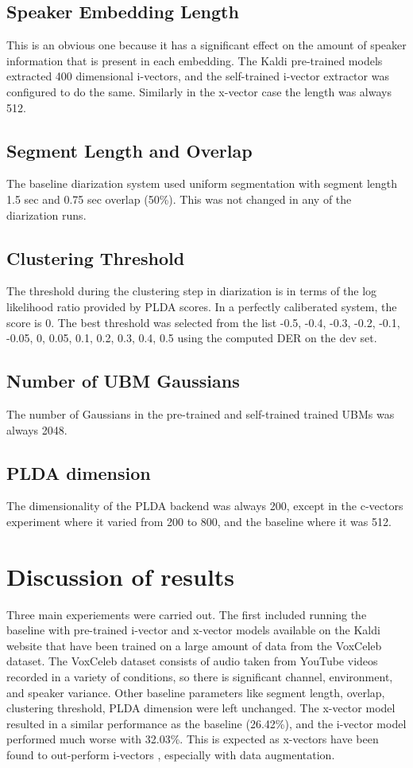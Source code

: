 		\subsection{Speaker Embedding Length}
			This is an obvious one because it has a significant effect on the amount of speaker information that is present in each embedding. The Kaldi pre-trained models extracted 400 dimensional i-vectors, and the self-trained i-vector extractor was configured to do the same. Similarly in the x-vector case the length was always 512.
		\subsection{Segment Length and Overlap}
		The baseline diarization system used uniform segmentation with segment length 1.5 sec and 0.75 sec overlap (50\%). This was not changed in any of the diarization runs.
		\subsection{Clustering Threshold}
		The threshold during the clustering step in diarization is in terms of the log likelihood ratio provided by PLDA scores. In a perfectly caliberated system, the score is 0. The best threshold was selected from the list -0.5, -0.4, -0.3, -0.2, -0.1, -0.05, 0, 0.05, 0.1, 0.2, 0.3, 0.4, 0.5 using the computed DER on the dev set.
		\subsection{Number of UBM Gaussians}
		The number of Gaussians in the pre-trained and self-trained trained UBMs was always 2048.
		\subsection{PLDA dimension}
		The dimensionality of the PLDA backend was always 200, except in the c-vectors experiment where it varied from 200 to 800, and the baseline where it was 512.

	\section{Discussion of results}
		Three main experiements were carried out. The first included running the baseline with pre-trained i-vector and x-vector models available on the Kaldi website that have been trained on a large amount of data from the VoxCeleb dataset. The VoxCeleb dataset consists of audio taken from YouTube videos recorded in a variety of conditions, so there is significant channel, environment, and speaker variance. Other baseline parameters like segment length, overlap, clustering threshold, PLDA dimension were left unchanged. The x-vector model resulted in a similar performance as the baseline (26.42\%), and the i-vector model performed much worse with 32.03\%. This is expected as x-vectors have been found to out-perform i-vectors \cite{snyder2018x}, especially with data augmentation.
		
